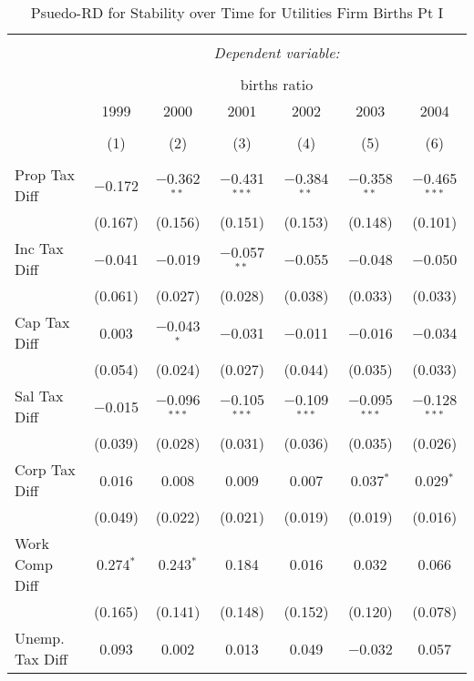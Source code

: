 
\begin{table}[!htbp] \centering 
  \caption{Psuedo-RD for Stability over Time for  Utilities Firm Births Pt I} 
  \label{22year} 
\small 
\begin{tabular}{@{\extracolsep{5pt}}lcccccc} 
\\[-1.8ex]\hline 
\hline \\[-1.8ex] 
 & \multicolumn{6}{c}{\textit{Dependent variable:}} \\ 
\cline{2-7} 
\\[-1.8ex] & \multicolumn{6}{c}{births ratio} \\ 
 & 1999 & 2000 & 2001 & 2002 & 2003 & 2004 \\ 
\\[-1.8ex] & (1) & (2) & (3) & (4) & (5) & (6)\\ 
\hline \\[-1.8ex] 
 Prop Tax Diff & $-$0.172 & $-$0.362$^{**}$ & $-$0.431$^{***}$ & $-$0.384$^{**}$ & $-$0.358$^{**}$ & $-$0.465$^{***}$ \\ 
  & (0.167) & (0.156) & (0.151) & (0.153) & (0.148) & (0.101) \\ 
  Inc Tax Diff & $-$0.041 & $-$0.019 & $-$0.057$^{**}$ & $-$0.055 & $-$0.048 & $-$0.050 \\ 
  & (0.061) & (0.027) & (0.028) & (0.038) & (0.033) & (0.033) \\ 
  Cap Tax Diff & 0.003 & $-$0.043$^{*}$ & $-$0.031 & $-$0.011 & $-$0.016 & $-$0.034 \\ 
  & (0.054) & (0.024) & (0.027) & (0.044) & (0.035) & (0.033) \\ 
  Sal Tax Diff & $-$0.015 & $-$0.096$^{***}$ & $-$0.105$^{***}$ & $-$0.109$^{***}$ & $-$0.095$^{***}$ & $-$0.128$^{***}$ \\ 
  & (0.039) & (0.028) & (0.031) & (0.036) & (0.035) & (0.026) \\ 
  Corp Tax Diff & 0.016 & 0.008 & 0.009 & 0.007 & 0.037$^{*}$ & 0.029$^{*}$ \\ 
  & (0.049) & (0.022) & (0.021) & (0.019) & (0.019) & (0.016) \\ 
  Work Comp Diff & 0.274$^{*}$ & 0.243$^{*}$ & 0.184 & 0.016 & 0.032 & 0.066 \\ 
  & (0.165) & (0.141) & (0.148) & (0.152) & (0.120) & (0.078) \\ 
  Unemp. Tax Diff & 0.093 & 0.002 & 0.013 & 0.049 & $-$0.032 & 0.057 \\ 

\end{tabular}
\end{table}
